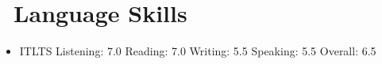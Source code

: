 \documentclass{resume}
\begin{document}
\section{\faInfo\ Language Skills}
\begin{itemize}[parsep=0.5ex]
  \item ITLTS Listening: 7.0 Reading: 7.0 Writing: 5.5 Speaking: 5.5 Overall: 6.5
\end{itemize}


%
%
\end{document}

